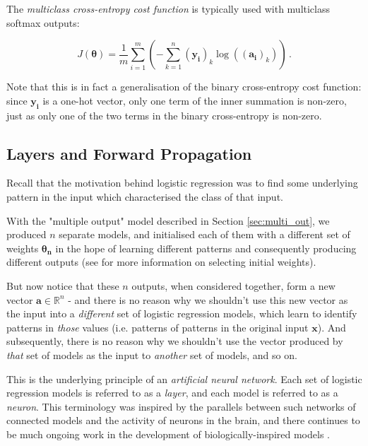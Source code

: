 \documentclass{article}[11pt]
\begin{document}
        The \textit{multiclass cross-entropy cost function} is typically used with multiclass softmax outputs:
        
        $$
        J(\boldsymbol{\theta}) = \frac{1}{m} \sum_{i=1}^{m} \left( - \sum_{k=1}^{n} (\mathbf{y_i})_k \log(\mathbf{(a_i)}_k) \right) \,.
        $$
        
        Note that this is in fact a generalisation of the binary cross-entropy cost function: since $\mathbf{y_i}$ is a one-hot vector, only one term of the inner summation is non-zero, just as only one of the two terms in the binary cross-entropy is non-zero.
        
        
        
    \subsection{Layers and Forward Propagation} \label{sec:forward_prop}
        
        Recall that the motivation behind logistic regression was to find some underlying pattern in the input which characterised the class of that input.
        
        With the "multiple output" model described in Section \ref{sec:multi_out}, we produced $n$ separate models, and initialised each of them with a different set of weights $\boldsymbol{\theta_n}$ in the hope of learning different patterns and consequently producing different outputs (see \cite{lecun_backprop} for more information on selecting initial weights).
        
        But now notice that these $n$ outputs, when considered together, form a new vector $\mathbf{a} \in \mathbb{R}^n$ - and there is no reason why we shouldn't use this new vector as the input into a \textit{different} set of logistic regression models, which learn to identify patterns in \textit{those} values (i.e. patterns of patterns in the original input $\mathbf{x}$). And subsequently, there is no reason why we shouldn't use the vector produced by \textit{that} set of models as the input to \textit{another} set of models, and so on.
        
        This is the underlying principle of an \textit{artificial neural network}. Each set of logistic regression models is referred to as a \textit{layer}, and each model is referred to as a \textit{neuron}. This terminology was inspired by the parallels between such networks of connected models and the activity of neurons in the brain, and there continues to be much ongoing work in the development of biologically-inspired models \cite{bionets}.
        
\end{document}
